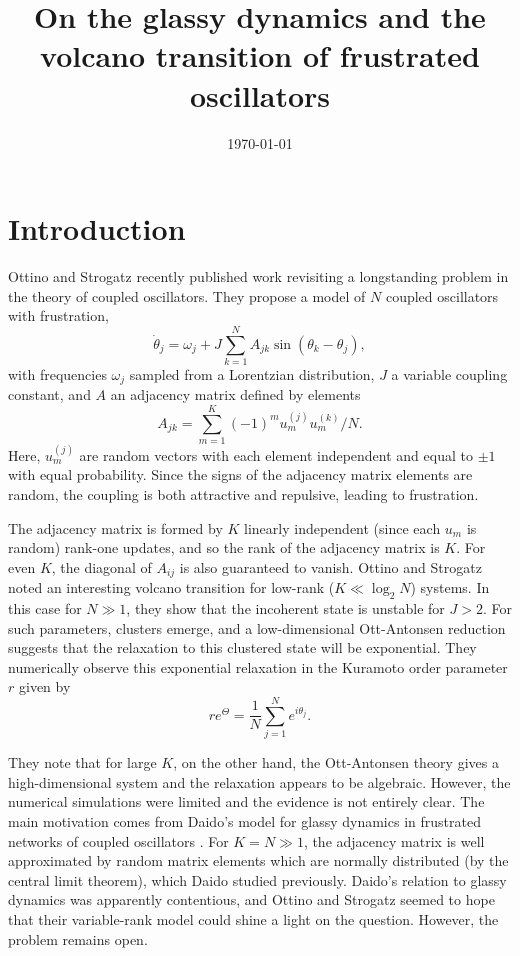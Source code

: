 \documentclass[aps,pre,amsmath,amssymb,floatfix,onecolumn,notitlepage,10pt]{revtex4-1}
\begin{document}
\title{On the glassy dynamics and the volcano transition of frustrated oscillators}
\date{\today}

\maketitle

\section{Introduction}
Ottino and Strogatz recently published work \cite{strogatz} revisiting a longstanding problem in the theory of coupled oscillators. 
They propose a model of $N$ coupled oscillators with frustration,
\begin{equation}
\label{ode}
\dot{\theta}_j = \omega_j +J\sum_{k=1}^N A_{jk}\sin\left(\theta_k-\theta_j\right),
\end{equation}
with frequencies $\omega_j$ sampled from a Lorentzian distribution, $J$ a variable coupling constant, and $A$ an adjacency matrix defined by elements
\begin{equation}
\label{adjacency}
A_{jk} = \sum_{m=1}^{K}(-1)^m u_m^{(j)}u_m^{(k)}/N.
\end{equation}
Here, $u_m^{(j)}$ are random vectors with each element independent and equal to $\pm 1$ with equal probability. Since the signs of the adjacency matrix elements are random, the coupling is both attractive and repulsive,  leading to frustration. 

The adjacency matrix is formed by $K$ linearly independent (since each $u_m$ is random) rank-one updates, and so the rank of the adjacency matrix is $K$. For even $K$, the diagonal of $A_{ij}$ is also guaranteed to vanish. Ottino and Strogatz noted an interesting volcano transition for low-rank ($K\ll \log_2 N$) systems. In this case for $N\gg 1$,  they show that the incoherent state is unstable for $J>2$. For such parameters, clusters emerge,  and a low-dimensional Ott-Antonsen reduction suggests that the relaxation to this clustered state will be exponential. They numerically observe this exponential relaxation in the Kuramoto order parameter $r$ given by
\begin{equation}
\label{kuramoto}
re^{\Theta} = \frac{1}{N}\sum_{j=1}^N e^{i\theta_j}.
\end{equation}

They note that for large $K$, on the other hand, the Ott-Antonsen theory gives a high-dimensional system and the relaxation appears to be algebraic. However, the numerical simulations were limited and the evidence is not entirely clear. The main motivation comes from Daido's model for glassy dynamics in frustrated networks of coupled oscillators \cite{daido}. For $K=N\gg 1$, the adjacency matrix is well approximated by random matrix elements which are normally distributed (by the central limit theorem), which Daido studied previously.   Daido's relation to glassy dynamics was apparently contentious, and Ottino and Strogatz seemed to hope that their variable-rank model could shine a light on the question. However, the problem remains open.
\end{document}
